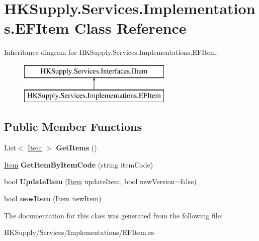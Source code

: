 \hypertarget{class_h_k_supply_1_1_services_1_1_implementations_1_1_e_f_item}{}\section{H\+K\+Supply.\+Services.\+Implementations.\+E\+F\+Item Class Reference}
\label{class_h_k_supply_1_1_services_1_1_implementations_1_1_e_f_item}
Inheritance diagram for H\+K\+Supply.\+Services.\+Implementations.\+E\+F\+Item\+:\begin{figure}[H]
\begin{center}
\leavevmode
\includegraphics[height=2.000000cm]{class_h_k_supply_1_1_services_1_1_implementations_1_1_e_f_item}
\end{center}
\end{figure}
\subsection*{Public Member Functions}
\begin{DoxyCompactItemize}
\item 
\mbox{\label{class_h_k_supply_1_1_services_1_1_implementations_1_1_e_f_item_a9d322fe0d1e423df09d2cb2227921ca9}} 
List$<$ \hyperlink{class_h_k_supply_1_1_models_1_1_item}{Item} $>$ {\bfseries Get\+Items} ()
\item 
\mbox{\label{class_h_k_supply_1_1_services_1_1_implementations_1_1_e_f_item_a87d26fea78764fb424a5f9f0b36ee59c}} 
\hyperlink{class_h_k_supply_1_1_models_1_1_item}{Item} {\bfseries Get\+Item\+By\+Item\+Code} (string item\+Code)
\item 
\mbox{\label{class_h_k_supply_1_1_services_1_1_implementations_1_1_e_f_item_af4caa1e3ec78b135c85bdf367aaddadc}} 
bool {\bfseries Update\+Item} (\hyperlink{class_h_k_supply_1_1_models_1_1_item}{Item} update\+Item, bool new\+Version=false)
\item 
\mbox{\label{class_h_k_supply_1_1_services_1_1_implementations_1_1_e_f_item_aca94494edffbe467c26e3229f8fbdfcf}} 
bool {\bfseries new\+Item} (\hyperlink{class_h_k_supply_1_1_models_1_1_item}{Item} new\+Item)
\end{DoxyCompactItemize}


The documentation for this class was generated from the following file\+:\begin{DoxyCompactItemize}
\item 
H\+K\+Supply/\+Services/\+Implementations/E\+F\+Item.\+cs\end{DoxyCompactItemize}
